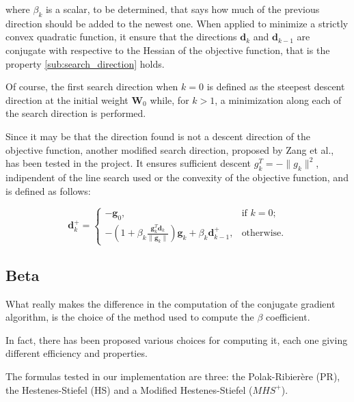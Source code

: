 			where $\beta_k$ is a scalar, to be determined, that says how much of the previous direction should be added to the newest one. When applied to minimize a strictly convex quadratic function, it ensure that the directions $\textbf{d}_{k}$ and $\textbf{d}_{k-1}$ are conjugate with respective to the Hessian of the objective function, that is the property \ref{sub:search_direction} holds.

			Of course, the first search direction when $k = 0$ is defined as the steepest descent direction at the initial weight $\textbf{W}_0$ while, for $k > 1$, a minimization along each of the search direction is performed.

			Since it may be that the direction found is not a descent direction of the objective function, another modified search direction, proposed by Zang et al.\cite{L-2006}, has been tested in the project. It ensures sufficient descent $g_k^T = -\|g_k\|^2$, indipendent of the line search used or the convexity of the objective function, and is defined as follows:

			\begin{equation}
			\label{mod_dir}
				\textbf{d}_k^+=\begin{cases}
			    -\textbf{g}_0, & \text{if $k=0$};\\
			    -(1 + \beta_k\frac{\textbf{g}_k^T\textbf{d}_{k}}{\|\textbf{g}_k\|})\textbf{g}_k + \beta_k\textbf{d}_{k-1}^+, & \text{otherwise.}
			  \end{cases}
			\end{equation}



		\subsection{Beta}
		\label{sub:beta}
			What really makes the difference in the computation of the conjugate gradient algorithm, is the choice of the method used to compute the $\beta$ coefficient.

			In fact, there has been proposed various choices for computing it, each one giving different efficiency and properties.

			The formulas tested in our implementation are three: the Polak-Ribierère (PR), the Hestenes-Stiefel (HS) and a Modified Hestenes-Stiefel ($MHS^+$).

